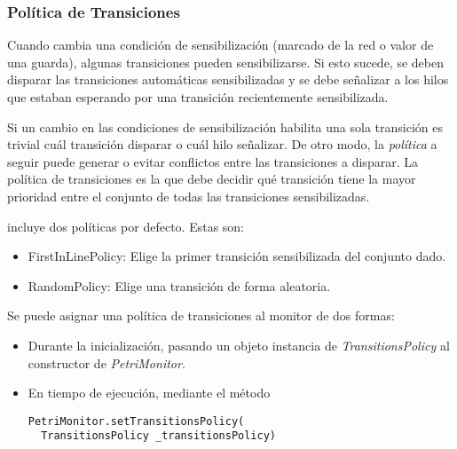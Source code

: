 \subsubsection{Política de Transiciones}
\label{sec:politica_transiciones}
Cuando cambia una condición de sensibilización (marcado de la red o valor de
una guarda), algunas transiciones pueden sensibilizarse. Si esto sucede, se
deben disparar las transiciones automáticas sensibilizadas y se debe señalizar a
los hilos que estaban esperando por una transición recientemente sensibilizada.

Si un cambio en las condiciones de sensibilización habilita una sola
transición es trivial cuál transición disparar o cuál hilo señalizar. De otro
modo, la \textit{política} a seguir puede generar o evitar conflictos entre las
transiciones a disparar.
La política de transiciones es la que debe decidir qué transición tiene la mayor
prioridad entre el conjunto de todas las transiciones sensibilizadas.

\javapetriconcurrencymonitor incluye dos políticas por defecto. Estas son:
\begin{itemize}
    \item FirstInLinePolicy: Elige la primer transición sensibilizada del
    conjunto dado.
    \item RandomPolicy: Elige una transición de forma aleatoria.
\end{itemize}

Se puede asignar una política de transiciones al monitor de dos formas:

\begin{itemize}
    \item Durante la inicialización, pasando un objeto instancia de
    \textit{TransitionsPolicy} al constructor de \textit{PetriMonitor}.
    \item En tiempo de ejecución, mediante el método\\ {
    \begin{verbatim}
PetriMonitor.setTransitionsPolicy(
  TransitionsPolicy _transitionsPolicy)
    \end{verbatim}
    }
\end{itemize}

